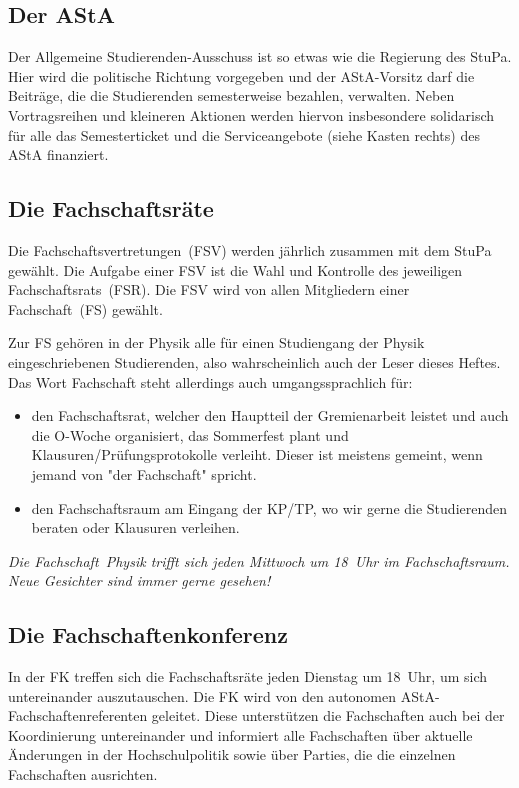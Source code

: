 \begin{multicols*}{2}
\subsection*{Der AStA}
Der Allgemeine Studierenden-Ausschuss ist so etwas wie die Regierung des StuPa. Hier wird die politische Richtung vorgegeben und der AStA-Vorsitz darf die Beiträge, die die Studierenden semesterweise bezahlen, verwalten. Neben Vortragsreihen und kleineren Aktionen werden hiervon insbesondere solidarisch für alle das Semesterticket und die Serviceangebote (siehe Kasten rechts) des AStA finanziert.

\subsection*{Die Fachschaftsräte}
Die Fachschaftsvertretungen~(FSV) werden jährlich zusammen mit dem StuPa gewählt. Die Aufgabe einer FSV ist die Wahl und Kontrolle des jeweiligen Fachschaftsrats~(FSR). Die FSV wird von allen Mitgliedern einer Fachschaft~(FS) gewählt.

Zur FS gehören in der Physik alle für einen Studiengang der Physik eingeschriebenen Studierenden, also wahrscheinlich auch der Leser dieses Heftes. Das Wort Fachschaft steht allerdings auch umgangssprachlich für:
\begin{itemize}
\item den Fachschaftsrat, welcher den Hauptteil der Gremienarbeit leistet und auch die O-Woche organisiert, das Sommerfest plant und Klausuren/Prüfungsprotokolle verleiht. Dieser ist meistens gemeint, wenn jemand von "der Fachschaft" spricht.
\item den Fachschaftsraum am Eingang der KP/TP, wo wir gerne die Studierenden beraten oder Klausuren verleihen.
\end{itemize}
\emph{Die Fachschaft~Physik trifft sich jeden Mittwoch um 18~Uhr im Fachschaftsraum. Neue Gesichter sind immer gerne gesehen!}

\subsection*{Die Fachschaftenkonferenz}
In der FK treffen sich die Fachschaftsräte jeden Dienstag um 18~Uhr, um sich untereinander auszutauschen. Die FK wird von den autonomen AStA-Fachschaftenreferenten geleitet. Diese unterstützen die Fachschaften auch bei der Koordinierung untereinander und informiert alle Fachschaften über aktuelle Änderungen in der Hochschulpolitik sowie über Parties, die die einzelnen Fachschaften ausrichten.

\end{multicols*}
\clearpage



